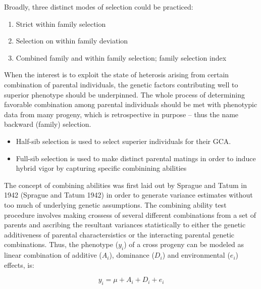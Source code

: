 \documentclass[11pt,dvipsnames,ignorenonframetext,aspectratio=169]{beamer}
\providecommand{\tightlist}{%
  \setlength{\itemsep}{0pt}\setlength{\parskip}{0pt}}
\begin{document}
\begin{frame}{}
\protect\hypertarget{section-1}{}
Broadly, three distinct modes of selection could be practiced:

\begin{enumerate}
\tightlist
\item
  Strict within family selection
\item
  Selection on within family deviation
\item
  Combined family and within family selection; family selection index
\end{enumerate}

\footnotesize

When the interest is to exploit the state of heterosis arising from
certain combination of parental individuals, the genetic factors
contributing well to superior phenotype should be underpinned. The whole
process of determining favorable combination among parental individuals
should be met with phenotypic data from many progeny, which is
retrospective in purpose -- thus the name backward (family) selection.

\begin{itemize}
\tightlist
\item
  Half-sib selection is used to select superier individuals for their
  GCA.
\item
  Full-sib selection is used to make distinct parental matings in order
  to induce hybrid vigor by capturing specific combinining abilities
\end{itemize}
\end{frame}

\begin{frame}{}
\protect\hypertarget{section-2}{}
The concept of combining abilities was first laid out by Sprague and
Tatum in 1942 (Sprague and Tatum 1942) in order to generate variance
estimates without too much of underlying genetic assumptions. The
combining ability test procedure involves making crossess of several
different combinations from a set of parents and ascribing the resultant
variances statistically to either the genetic additiveness of parental
charactersistics or the interacting parental genetic combinations. Thus,
the phenotype (\(y_i\)) of a cross progeny can be modeled as linear
combination of additive (\(A_i\)), dominance (\(D_i\)) and environmental
(\(e_i\)) effects, is:

\[y_i = \mu + A_i + D_i + e_i\]
\end{frame}
\end{document}
